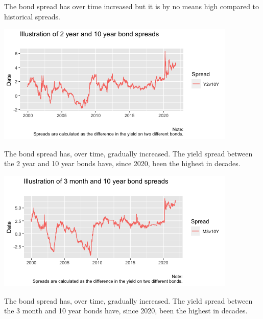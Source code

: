 \documentclass[11pt,preprint, authoryear]{elsarticle}
\let\origfigure\figure
\let\endorigfigure\endfigure
\renewenvironment{figure}[1][2] {
    \expandafter\origfigure\expandafter[H]
} {
    \endorigfigure
}
\numberwithin{equation}{section}
\numberwithin{figure}{section}
\numberwithin{table}{section}
\begin{document}
The bond spread has over time increased but it is by no means high
compared to historical spreads.

\begin{figure}[H]

{\centering \includegraphics{Question2_files/figure-latex/Figure2-1} 

}

\caption{Caption Here \label{Figure2}}\label{fig:Figure2}
\end{figure}

The bond spread has, over time, gradually increased. The yield spread
between the 2 year and 10 year bonds have, since 2020, been the highest
in decades.

\begin{figure}[H]

{\centering \includegraphics{Question2_files/figure-latex/Figure3-1} 

}

\caption{Caption Here \label{Figure3}}\label{fig:Figure3}
\end{figure}

The bond spread has, over time, gradually increased. The yield spread
between the 3 month and 10 year bonds have, since 2020, been the highest
in decades.
\end{document}
